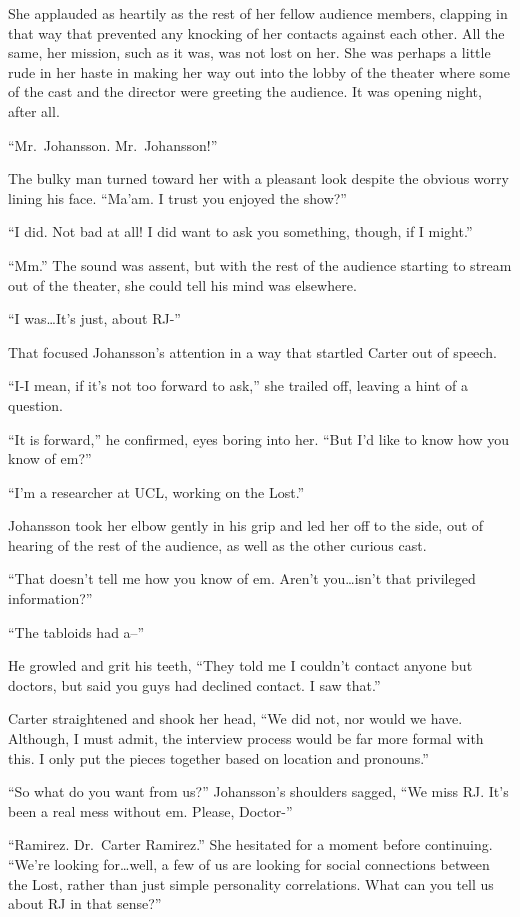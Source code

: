 She applauded as heartily as the rest of her fellow audience members, clapping in that way that prevented any knocking of her contacts against each other. All the same, her mission, such as it was, was not lost on her. She was perhaps a little rude in her haste in making her way out into the lobby of the theater where some of the cast and the director were greeting the audience. It was opening night, after all.

``Mr.~Johansson. Mr.~Johansson!''

The bulky man turned toward her with a pleasant look despite the obvious worry lining his face. ``Ma'am. I trust you enjoyed the show?''

``I did. Not bad at all! I did want to ask you something, though, if I might.''

``Mm.'' The sound was assent, but with the rest of the audience starting to stream out of the theater, she could tell his mind was elsewhere.

``I was\ldots{}It's just, about RJ-''

That focused Johansson's attention in a way that startled Carter out of speech.

``I-I mean, if it's not too forward to ask,'' she trailed off, leaving a hint of a question.

``It is forward,'' he confirmed, eyes boring into her. ``But I'd like to know how you know of em?''

``I'm a researcher at UCL, working on the Lost.''

Johansson took her elbow gently in his grip and led her off to the side, out of hearing of the rest of the audience, as well as the other curious cast.

``That doesn't tell me how you know of em. Aren't you\ldots{}isn't that privileged information?''

``The tabloids had a--''

He growled and grit his teeth, ``They told me I couldn't contact anyone but doctors, but said you guys had declined contact. I saw that.''

Carter straightened and shook her head, ``We did not, nor would we have. Although, I must admit, the interview process would be far more formal with this. I only put the pieces together based on location and pronouns.''

``So what do you want from us?'' Johansson's shoulders sagged, ``We miss RJ. It's been a real mess without em. Please, Doctor-''

``Ramirez. Dr.~Carter Ramirez.'' She hesitated for a moment before continuing. ``We're looking for\ldots{}well, a few of us are looking for social connections between the Lost, rather than just simple personality correlations. What can you tell us about RJ in that sense?''

